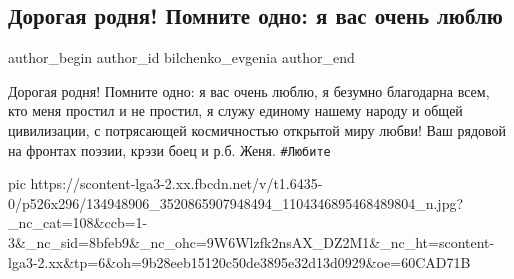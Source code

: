  
 
 
 
 
 
\subsection{Дорогая родня! Помните одно: я вас очень люблю}
\label{sec:31_12_2020.fb.bilchenko_evgenia.2.ljublju_rodnja}
\ifcmt
 author_begin
   author_id bilchenko_evgenia
 author_end
\fi

Дорогая родня! Помните одно: я вас очень люблю, я безумно благодарна всем, кто
меня простил и не простил, я служу единому нашему народу и общей цивилизации, с
потрясающей космичностью открытой миру любви! Ваш рядовой на фронтах поэзии,
крэзи боец и р.б. Женя. \verb|#Любите|

\ifcmt
  pic https://scontent-lga3-2.xx.fbcdn.net/v/t1.6435-0/p526x296/134948906_3520865907948494_1104346895468489804_n.jpg?_nc_cat=108&ccb=1-3&_nc_sid=8bfeb9&_nc_ohc=9W6Wlzfk2nsAX_DZ2M1&_nc_ht=scontent-lga3-2.xx&tp=6&oh=9b28eeb15120c50de3895e32d13d0929&oe=60CAD71B
\fi
